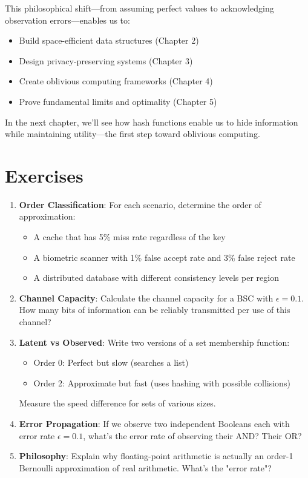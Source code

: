 This philosophical shift—from assuming perfect values to acknowledging observation errors—enables us to:
\begin{itemize}
\item Build space-efficient data structures (Chapter 2)
\item Design privacy-preserving systems (Chapter 3)  
\item Create oblivious computing frameworks (Chapter 4)
\item Prove fundamental limits and optimality (Chapter 5)
\end{itemize}

In the next chapter, we'll see how hash functions enable us to hide information while maintaining utility—the first step toward oblivious computing.

\section{Exercises}

\begin{enumerate}
\item \textbf{Order Classification}: For each scenario, determine the order of approximation:
   \begin{itemize}
   \item A cache that has 5\% miss rate regardless of the key
   \item A biometric scanner with 1\% false accept rate and 3\% false reject rate
   \item A distributed database with different consistency levels per region
   \end{itemize}

\item \textbf{Channel Capacity}: Calculate the channel capacity for a BSC with $\epsilon = 0.1$. How many bits of information can be reliably transmitted per use of this channel?

\item \textbf{Latent vs Observed}: Write two versions of a set membership function:
   \begin{itemize}
   \item Order 0: Perfect but slow (searches a list)
   \item Order 2: Approximate but fast (uses hashing with possible collisions)
   \end{itemize}
   Measure the speed difference for sets of various sizes.

\item \textbf{Error Propagation}: If we observe two independent Booleans each with error rate $\epsilon = 0.1$, what's the error rate of observing their AND? Their OR?

\item \textbf{Philosophy}: Explain why floating-point arithmetic is actually an order-1 Bernoulli approximation of real arithmetic. What's the "error rate"?
\end{enumerate}